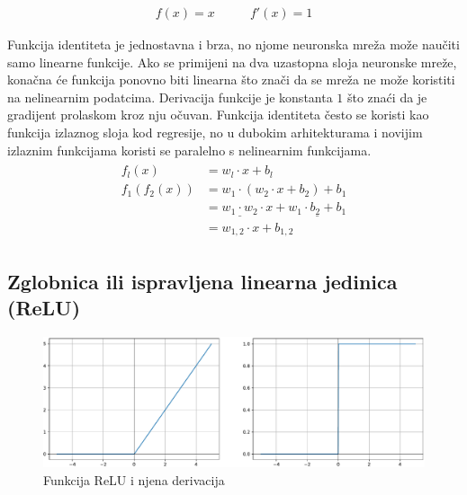 \documentclass[times, utf8, numeric, diplomski]{fer}
\begin{document}
\begin{equation}
\begin{split}
f(x) = x
\end{split}
\qquad
\begin{split}
f'(x) = 1
\end{split}
\end{equation}

Funkcija identiteta je jednostavna i brza, no njome neuronska mreža može naučiti samo linearne funkcije. Ako se primijeni na dva uzastopna sloja neuronske mreže, konačna će funkcija ponovno biti linearna što znači da se mreža ne može koristiti na nelinearnim podatcima. Derivacija funkcije je konstanta $1$ što znaći da je gradijent prolaskom kroz nju očuvan. Funkcija identiteta često se koristi kao funkcija izlaznog sloja kod regresije, no u dubokim arhitekturama \citep{resnet,densenet} i novijim izlaznim funkcijama \citep{swish,elish} koristi se paralelno s nelinearnim funkcijama.
\begin{align}
\begin{split}
f_l(x) &= w_l \cdot x + b_l \\
f_1(f_2(x)) &= w_1 \cdot (w_2 \cdot x + b_2) + b_1 \\
&= \underline{w_1 \cdot w_2} \cdot x + \underline{w_1 \cdot b_2 + b_1} \\
&= w_{1,2} \cdot x + b_{1,2}
\end{split}
\end{align}

\subsection{Zglobnica ili ispravljena linearna jedinica (ReLU)}
\label{func:relu}

\begin{figure}[H]
\includegraphics[width=\textwidth]{ReLU.pdf}
\centering
\caption{Funkcija ReLU i njena derivacija}
\label{fig:relu}
\end{figure}
\end{document}
